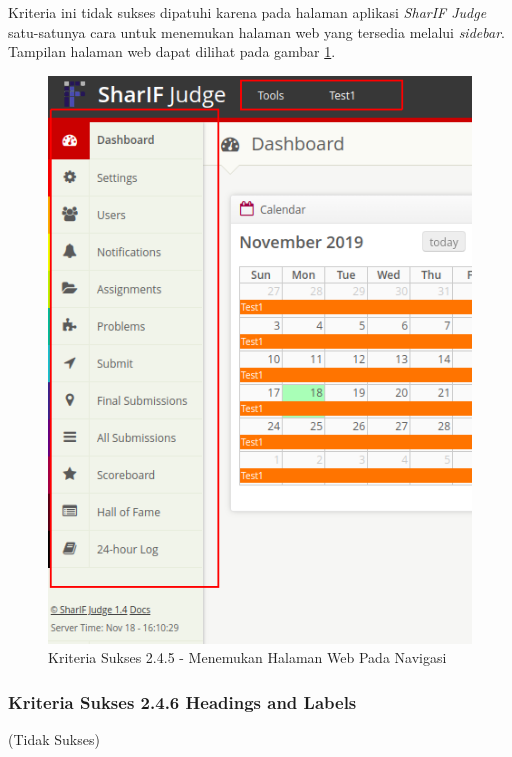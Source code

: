 \documentclass[a4paper,twoside]{article}
\begin{document}
\begin{enumerate}
		Kriteria ini tidak sukses dipatuhi karena pada halaman aplikasi \textit{SharIF Judge} satu-satunya cara untuk menemukan halaman web yang tersedia melalui \textit{sidebar}. Tampilan halaman web dapat dilihat pada gambar \ref{fig:kepatuhan_2_4_5}.
		\begin{figure}[H]
			\centering  
			\includegraphics[scale=0.5]{kepatuhan_2_4_5}  
			\caption[Kriteria Sukses 2.4.5 - Menemukan Halaman Web Pada Navigasi]{Kriteria Sukses 2.4.5 - Menemukan Halaman Web Pada Navigasi} 
			\label{fig:kepatuhan_2_4_5} 
		\end{figure}
		
		\subsubsection*{Kriteria Sukses 2.4.6 Headings and Labels}
		\label{subsubsec:kepatuhan_kriteria_2.4.6}
		(Tidak Sukses) \\
		

\end{enumerate}
\end{document}
